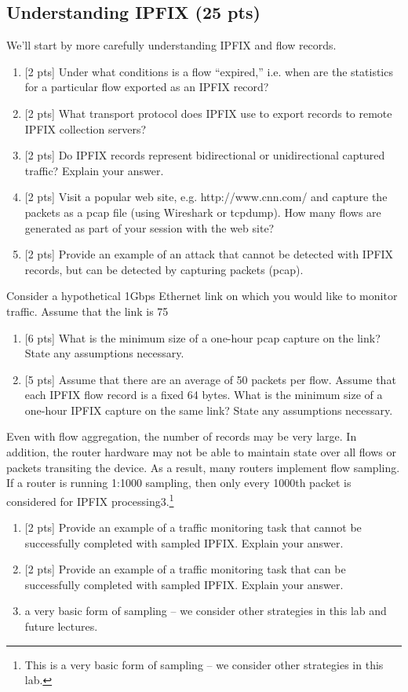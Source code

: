 \subsection{Understanding IPFIX (25 pts)}
We'll start by more carefully understanding IPFIX and flow records.
\begin{enumerate}
\item {[2 pts]} Under what conditions is a flow “expired,” i.e. when are the statistics for a particular flow exported as an IPFIX record?
\item {[2 pts]} What transport protocol does IPFIX use to export records to remote IPFIX collection servers?
\item {[2 pts]} Do IPFIX records represent bidirectional or unidirectional captured traffic? Explain your answer.
\item {[2 pts]} Visit a popular web site, e.g. http://www.cnn.com/ and capture the packets as a pcap file (using Wireshark or tcpdump). How many flows are generated as part of your session with the web site?
\item {[2 pts]} Provide an example of an attack that cannot be detected with IPFIX records, but can be detected by capturing packets (pcap).
\end{enumerate}
Consider a hypothetical 1Gbps Ethernet link on which you would like to monitor traffic. Assume that the link is 75%
\begin{enumerate}[resume]
\item {[6 pts]} What is the minimum size of a one-hour pcap capture on the link? State any assumptions necessary.
\item {[5 pts]} Assume that there are an average of 50 packets per flow. Assume that each IPFIX flow record is a fixed 64 bytes. What is the minimum size of a one-hour IPFIX capture on the same link? State any assumptions necessary.
\end{enumerate}
Even with flow aggregation, the number of records may be very large. In addition, the router hardware may not be able to maintain state over all flows or packets transiting the device. As a result, many routers implement flow sampling. If a router is running 1:1000 sampling, then only every 1000th packet is considered for IPFIX processing3.\footnote{This is a very basic form of sampling – we consider other strategies in this lab.}
\begin{enumerate}[resume]
\item {[2 pts]} Provide an example of a traffic monitoring task that cannot be successfully completed with sampled IPFIX. Explain your answer.
\item {[2 pts]} Provide an example of a traffic monitoring task that can be successfully completed with sampled IPFIX. Explain your answer.
\item a very basic form of sampling – we consider other strategies in this lab and future lectures.
\end{enumerate}
 
